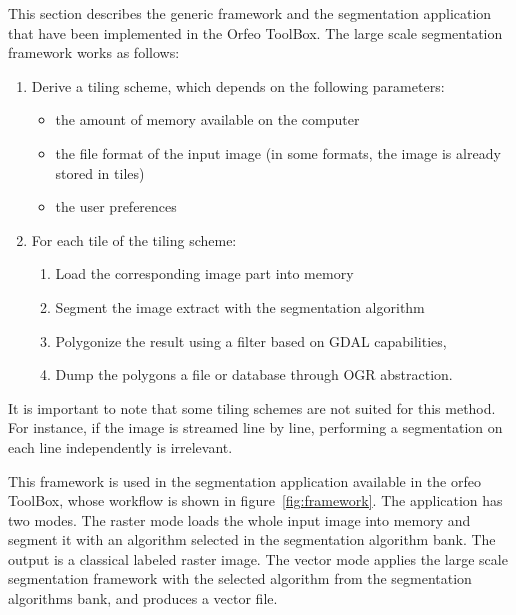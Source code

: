 \documentclass{josis}
\begin{document}
This section describes the generic framework and the segmentation
application that have been implemented in the Orfeo ToolBox. The large
scale segmentation framework works as follows:
\begin{enumerate}[1 - ]
\item Derive a tiling scheme, which depends on the following
  parameters:
\begin{itemize}
\item the amount of memory available on the computer
\item the file format of the input image (in some formats,
the image is already stored in tiles)
\item the user preferences
\end{itemize}
\item For each tile of the tiling scheme:
\begin{enumerate}[a - ]
\item Load the corresponding image part into memory
\item Segment the image extract with the segmentation algorithm
\item Polygonize the result using a filter based on GDAL capabilities,
\item Dump the polygons a file or database through OGR
      abstraction.
\end{enumerate}
\end{enumerate}

It is important to note that some tiling schemes are not suited for
this method. For instance, if the image is streamed line by line,
performing a segmentation on each line independently is irrelevant.

This framework is used in the segmentation application available in
the orfeo ToolBox, whose workflow is shown in
figure~\ref{fig:framework}. The application has two modes. The raster
mode loads the whole input image into memory and segment it with an
algorithm selected in the segmentation algorithm bank. The output is a
classical labeled raster image. The vector mode applies the large
scale segmentation framework with the selected algorithm from the
segmentation algorithms bank, and produces a vector file.
\end{document}
